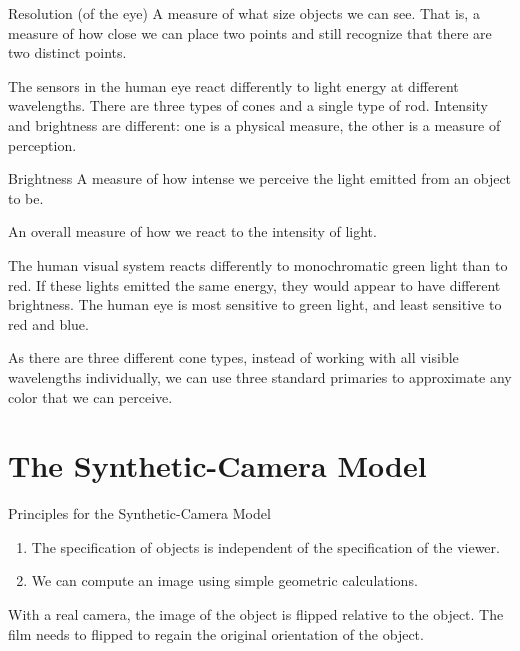 \documentclass[../COS3712_Notes.tex]{subfiles}
\begin{document}
        \begin{definition}{Resolution (of the eye)}
          A measure of what size objects we can see.
          That is, a measure of how close we can place two points
          and still recognize that there are two distinct points.
        \end{definition}

        The sensors in the human eye react differently to light energy at different wavelengths.
        There are three types of cones and a single type of rod.
        Intensity and brightness are different:
        one is a physical measure, the other is a measure of perception.

        \begin{definition}{Brightness}
          A measure of how intense we perceive the light emitted from an object to be.

          An overall measure of how we react to the intensity of light.
        \end{definition}

        The human visual system reacts differently to monochromatic green light than to red.
        If these lights emitted the same energy, they would appear to have different brightness.
        The human eye is most sensitive to green light, and least sensitive to red and blue.

        As there are three different cone types,
        instead of working with all visible wavelengths individually,
        we can use three standard primaries to approximate any color that we can perceive.

    \section{The Synthetic-Camera Model}
      \begin{sidenote}{Principles for the Synthetic-Camera Model}
        \begin{enumerate}[nosep]
          \item The specification of objects is independent of the specification of the viewer.
          \item We can compute an image using simple geometric calculations.
        \end{enumerate}
      \end{sidenote}

      With a real camera, the image of the object is flipped relative to the object.
      The film needs to flipped to regain the original orientation of the object.
\end{document}
